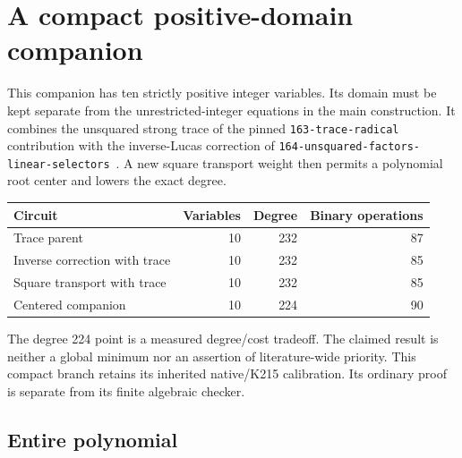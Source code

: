 \section{A compact positive-domain companion}
\label{sec:compact-center}

This companion has ten strictly positive integer variables.  Its domain
must be kept separate from the unrestricted-integer equations in the main
construction.  It combines the unsquared strong trace of the pinned
\texttt{163-trace-radical} contribution with the inverse-Lucas correction
of \texttt{164-unsquared-factors-linear-selectors}~\cite{trace163,inverse164}.  A new square transport
weight then permits a polynomial root center and lowers the exact degree.

\begin{center}
\begin{tabular}{lrrr}
\hline
Circuit & Variables & Degree & Binary operations\\
\hline
Trace parent & 10 & 232 & 87\\
Inverse correction with trace & 10 & 232 & 85\\
Square transport with trace & 10 & 232 & 85\\
Centered companion & 10 & 224 & 90\\
\hline
\end{tabular}
\end{center}

The degree 224 point is a measured degree/cost tradeoff.  The claimed result
is neither a global minimum nor an assertion of literature-wide priority.
This compact branch retains its inherited native/K215 calibration.  Its
ordinary proof is separate from its finite algebraic checker.

\subsection{Entire polynomial}

